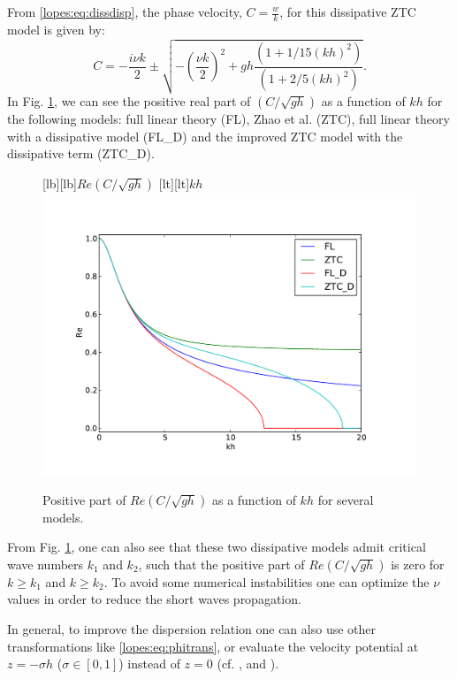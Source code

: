 From \eqref{lopes:eq:dissdisp}, the
 phase velocity, \(\displaystyle C=\frac{w}{k}\),  for this dissipative ZTC model is
 given by:
\begin{equation}
C=-\frac{i\nu k}{2}\pm\sqrt{-\left(\frac{\nu k}{2}\right)^2+gh\frac{(1+1/15(kh)^2)}{(1+2/5(kh)^2)}}.
\end{equation}
In Fig. \ref{lopes:fig:dispersion}, we can see the positive real
part
of \(\displaystyle\left(C/\sqrt{gh}\right)\) as a function of \(kh\) for the following models:
  full linear theory (FL),
Zhao et al. (ZTC), full linear theory with a
dissipative model (FL\_D) and the
improved  ZTC model with the dissipative term (ZTC\_D).
  \begin{figure}[!htb]
{\centering
{}[lb][lb]{$Re\left(C/\sqrt{gh}\right)$}
[lt][lt]{$kh$}
\includegraphics[width=\largewidth]{chapters/lopes/pdf/dispersion.pdf}
\caption{Positive  part of \(\displaystyle
Re\left(C/\sqrt{gh}\right)\) as a function of \(kh\) for several models.}
\label{lopes:fig:dispersion}\par}
\end{figure}
From Fig. \ref{lopes:fig:dispersion}, one can also see that
  these two dissipative models  admit
critical wave numbers \(k_1\) and \(k_2\),
such that the positive  part of \(\displaystyle Re\left(C/\sqrt{gh}\right)\) is zero
for \(k\geq k_1\) and \(k\geq k_2\).
To avoid some numerical instabilities one can optimize
 the \(\nu\) values in order
 to reduce  the short waves propagation.


In general, to improve the dispersion relation one can also use other
 transformations like \eqref{lopes:eq:phitrans}, or evaluate the
 velocity potential at \(z=-\sigma h\) (\(\sigma\in[0,1]\))
 instead of  \(z=0\) (cf. \cite{BinghamMadsenEtAl2008}, \cite{MadsenAgnon2003} and \cite{MadsenBinghamEtAl2003}).

